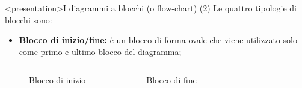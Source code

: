 \documentclass[
    notheorems,
    11pt,
    compress,
    aspectratio=169
]{beamer}
\begin{document}
\begin{frame}<presentation>{I diagrammi a blocchi (o flow-chart) (2)}
    Le quattro tipologie di blocchi sono:

    \begin{itemize}
        \item \textbf{Blocco di inizio/fine:} è un blocco di forma ovale che viene utilizzato solo come primo e ultimo blocco del diagramma;
    \end{itemize}

    \vspace{\baselineskip}

    \begin{columns}
            \begin{figure}
                \centering
        
                
                \caption{Blocco di inizio}
                \label{fig:11}
            \end{figure}

            \begin{figure}
                \centering
        
                
                \caption{Blocco di fine}
                \label{fig:12}
            \end{figure}
    \end{columns}
\end{frame}
\end{document}
